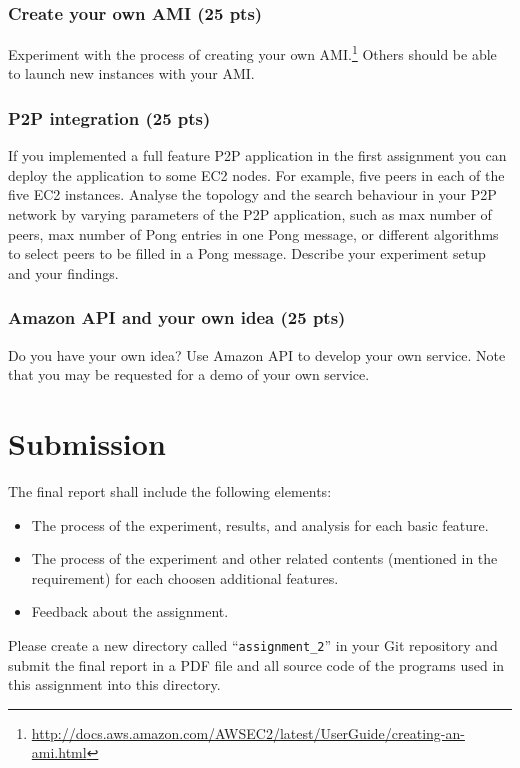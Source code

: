 \documentclass[12pt, a4paper]{article}
\begin{document}
\subsubsection{Create your own AMI (25 pts)}
Experiment with the process of creating your own AMI.\footnote{\url{http://docs.aws.amazon.com/AWSEC2/latest/UserGuide/creating-an-ami.html}}
Others should be able to launch new instances with your AMI.

\subsubsection{P2P integration (25 pts)}
If you implemented a full feature P2P application in the first assignment you can deploy the application to some EC2 nodes.
For example, five peers in each of the five EC2 instances.
Analyse the topology and the search behaviour in your P2P network by varying parameters of the P2P application, such as max number of peers, max number of Pong entries in one Pong message, or different algorithms to select peers to be filled in a Pong message.
Describe your experiment setup and your findings.

\subsubsection{Amazon API and your own idea (25 pts)}
Do you have your own idea?
Use Amazon API to develop your own service.
Note that you may be requested for a demo of your own service.

\section{Submission}
The final report shall include the following elements:

\begin{itemize}
\item The process of the experiment, results, and analysis for each basic feature.
\item The process of the experiment and other related contents (mentioned in the requirement) for each choosen additional features.
\item Feedback about the assignment.
\end{itemize}

Please create a new directory called ``\texttt{assignment\_2}'' in your Git repository and submit the final report in a PDF file and all source code of the programs used in this assignment into this directory.
\end{document}
